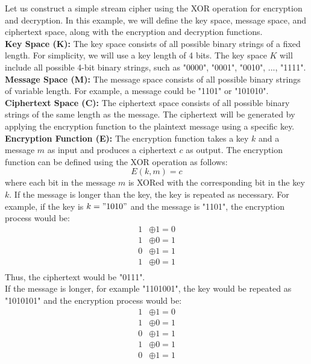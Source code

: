 \documentclass[openany]{book}
\begin{document}
\begin{example}
    Let us construct a simple stream cipher using the XOR operation for encryption and decryption. In this example, we will define the key space, message space, and ciphertext space, along with the encryption and decryption functions. \\
    \textbf{Key Space (K):} The key space consists of all possible binary strings of a fixed length. For simplicity, we will use a key length of 4 bits. The key space \( K \) will include all possible 4-bit binary strings, such as "0000", "0001", "0010", ..., "1111". \\
    \textbf{Message Space (M):} The message space consists of all possible binary strings of variable length. For example, a message could be "1101" or "101010". \\
    \textbf{Ciphertext Space (C):} The ciphertext space consists of all possible binary strings of the same length as the message. The ciphertext will be generated by applying the encryption function to the plaintext message using a specific key. \\
    \textbf{Encryption Function (E):} The encryption function takes a key \( k \) and a message \( m \) as input and produces a ciphertext \( c \) as output. The encryption function can be defined using the XOR operation as follows:
    $$ E(k, m) = c $$
    where each bit in the message \( m \) is XORed with the corresponding bit in the key \( k \). If the message is longer than the key, the key is repeated as necessary. For example, if the key is \( k = "1010" \) and the message is "1101", the encryption process would be:
    \begin{align*}
        1 &\oplus 1 = 0 \\
        1 &\oplus 0 = 1 \\
        0 &\oplus 1 = 1 \\
        1 &\oplus 0 = 1 \\
    \end{align*}
    Thus, the ciphertext would be "0111". \\
    If the message is longer, for example "1101001", the key would be repeated as "1010101" and the encryption process would be:
    \begin{align*}
        1 &\oplus 1 = 0 \\
        1 &\oplus 0 = 1 \\
        0 &\oplus 1 = 1 \\
        1 &\oplus 0 = 1 \\
        0 &\oplus 1 = 1 \\

\end{align*}
\end{example}
\end{document}
